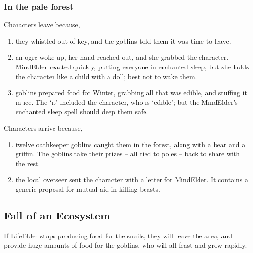 \begin{multicols}{2}
\subsubsection{In the pale forest}

Characters leave because,

\begin{enumerate}
  \item
  they whistled out of key, and the goblins told them it was time to leave.
  \item
  an ogre woke up, her hand reached out, and she grabbed the character.
  \gls{MindElder} reacted quickly, putting everyone in enchanted sleep, but she holds the character like a child with a doll; best not to wake them.
  \item
  goblins prepared food for Winter, grabbing all that was edible, and stuffing it in ice.
  The `it' included the character, who is `edible'; but the \gls{MindElder}'s enchanted sleep spell should deep them safe.
\end{enumerate}

Characters arrive because,

\begin{enumerate}
  \item
  twelve oathkeeper goblins caught them in the forest, along with a bear and a griffin.
  The goblins take their prizes -- all tied to poles -- back to share with the rest.
  \item
  the local overseer sent the character with a letter for \gls{MindElder}.
  It contains a generic proposal for mutual aid in killing beasts.
\end{enumerate}

\subsection{Fall of an Ecosystem}

If \gls{LifeElder} stops producing food for the snails, they will leave the area, and provide huge amounts of food for the goblins, who will all feast and grow rapidly.


\end{multicols}
